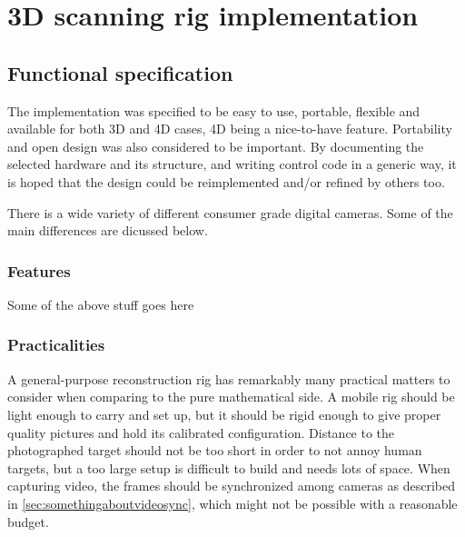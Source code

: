\section{3D scanning rig implementation}

\subsection{Functional specification} %

The implementation was specified to be easy to use, portable, flexible and available for both 3D and 4D cases, 4D being a nice-to-have feature.
Portability and open design was also considered to be important.
By documenting the selected hardware and its structure, and writing control code in a generic way, it is hoped that the design could be reimplemented and/or refined by others too.

There is a wide variety of different consumer grade digital cameras.
Some of the main differences are dicussed below.


\subsubsection{Features} %

Some of the above stuff goes here


\subsubsection{Practicalities} %

A general-purpose reconstruction rig has remarkably many practical matters to consider when comparing to the pure mathematical side.
A mobile rig should be light enough to carry and set up, but it should be rigid enough to give proper quality pictures and hold its calibrated configuration.
Distance to the photographed target should not be too short in order to not annoy human targets, but a too large setup is difficult to build and needs lots of space.
When capturing video, the frames should be synchronized among cameras as described in \ref{sec:somethingaboutvideosync}, which might not be possible with a reasonable budget.


